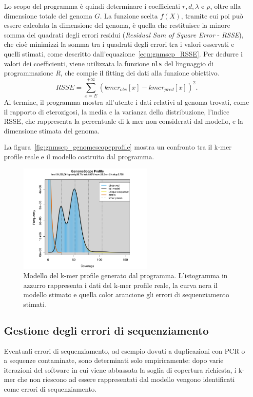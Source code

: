 \documentclass[crop=false, class=book]{standalone}
\begin{document}
	Lo scopo del programma è quindi determinare i coefficienti $r, d, \lambda$ e $\rho$, oltre alla dimensione totale del genoma $G$. La funzione scelta $f(X)$, tramite cui poi può essere calcolata la dimensione del genoma, è quella che restituisce la minore somma dei quadrati degli errori residui (\textit{Residual Sum of Square Error} - \textit{RSSE}), che cioè minimizzi la somma tra i quadrati degli errori tra i valori osservati e quelli stimati, come descritto dall'equazione~\vref{eqn:gnmscp_RSSE}. Per dedurre i valori dei coefficienti, viene utilizzata la funzione \verb|nls| del linguaggio di programmazione \textit{R}, che compie il \gls{fitting} dei dati alla funzione obiettivo.
	\begin{equation}
		RSSE = \sum_{x=E}^{+\infty} \left(kmer_{obs}[x] - kmer_{pred}[x]\right)^2.
	\label{eqn:gnmscp_RSSE}
	\end{equation}
	Al termine, il programma mostra all'utente i dati relativi al genoma trovati, come il rapporto di eterozigosi, la media e la varianza della distribuzione, l'indice RSSE, che rappresenta la percentuale di k-mer non considerati dal modello, e la dimensione stimata del genoma.
	
	La figura~\vref{fig:gnmscp_genomescopeprofile} mostra un confronto tra il k-mer profile reale e il modello costruito dal programma.
	
	\begin{figure}
		\centering
		\includegraphics[width=0.6\textwidth]{capitoli/genomescope/gnmscp_genomescopeprofile.png}
		\caption{Modello del k-mer profile generato dal programma. L'istogramma in azzurro rappresenta i dati del k-mer profile reale, la curva nera il modello stimato e quella color arancione gli errori di sequenziamento stimati.}
		\label{fig:gnmscp_genomescopeprofile}
	\end{figure}


	\subsection{Gestione degli errori di sequenziamento}
	Eventuali errori di sequenziamento, ad esempio dovuti a duplicazioni con PCR o a sequenze contaminate, sono determinati solo empiricamente: dopo varie iterazioni del software in cui viene abbassata la soglia di copertura richiesta, i k-mer che non riescono ad essere rappresentati dal modello vengono identificati come errori di sequenziamento. 
	
\end{document}
